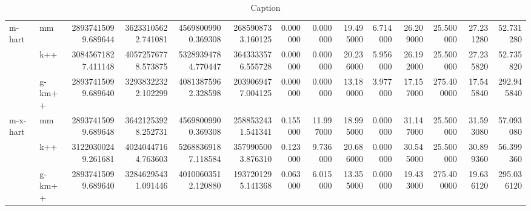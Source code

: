 \begin{table}[!ht]
{\begin{tabular}{llrrrrrrrrrrrr}
\cline{1-14}
\multirow[t]{3}{*}{m-hart} & mm & 28937415099.689644 & 36233105622.741081 & 45698009900.369308 & 2685908733.160125 & 0.000000 & 0.000000 & 19.495000 & 6.714000 & 26.209000 & 25.500000 & 27.231280 & 52.731280 \\
 & k++ & 30845671827.411148 & 40572576778.573875 & 53289394784.770447 & 3643333576.555728 & 0.000000 & 0.000000 & 20.236000 & 5.956000 & 26.192000 & 25.500000 & 27.235820 & 52.735820 \\
 & g-km++ & 28937415099.689640 & 32938322322.102299 & 40813875962.328598 & 2039069477.004125 & 0.000000 & 0.000000 & 13.180000 & 3.977000 & 17.157000 & 275.400000 & 17.545840 & 292.945840 \\
\cline{1-14}
\multirow[t]{3}{*}{m-x-hart} & mm & 28937415099.689648 & 36421253928.252731 & 45698009900.369308 & 2588532431.541341 & 0.155000 & 11.997000 & 18.995000 & 0.000000 & 31.147000 & 25.500000 & 31.593080 & 57.093080 \\
 & k++ & 31220300249.261681 & 40240447164.763603 & 52688369187.118584 & 3579905003.876310 & 0.123000 & 9.736000 & 20.686000 & 0.000000 & 30.545000 & 25.500000 & 30.899360 & 56.399360 \\
 & g-km++ & 28937415099.689640 & 32846295431.091446 & 40100603512.120880 & 1937201295.141368 & 0.063000 & 6.015000 & 13.355000 & 0.000000 & 19.433000 & 275.400000 & 19.636120 & 295.036120 \\
\cline{1-14}
\hline
\end{tabular}
}

\caption{Caption}
\label{tab:my_label}
\end{table}